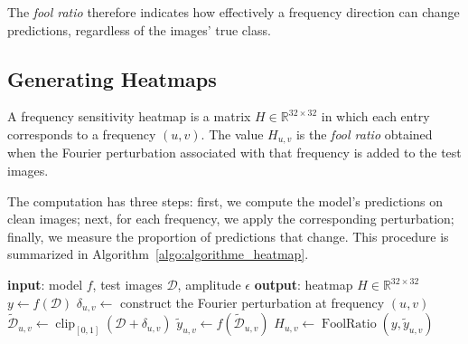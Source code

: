 The \textit{fool ratio} therefore indicates how effectively a frequency direction can change
predictions, regardless of the images' true class.




\subsection{Generating Heatmaps}
\label{subsec:generation_heatmaps}

A frequency sensitivity heatmap is a matrix $H \in \mathbb{R}^{32\times32}$ in which each
entry corresponds to a frequency $(u,v)$. The value $H_{u,v}$ is the \textit{fool ratio} obtained when
the Fourier perturbation associated with that frequency is added to the test images.

The computation has three steps: first, we compute the model's predictions on clean images;
next, for each frequency, we apply the corresponding perturbation; finally, we measure
the proportion of predictions that change. This procedure is summarized in
Algorithm~\ref{algo:algorithme_heatmap}.

\begin{algorithm}[H]
\caption{Generating a frequency sensitivity heatmap}
\label{algo:algorithme_heatmap}
\begin{algorithmic}
\State \textbf{input}: model $f$, test images $\mathcal{D}$, amplitude $\epsilon$
\State \textbf{output}: heatmap $H \in \mathbb{R}^{32 \times 32}$
\State
\State $y \leftarrow f(\mathcal{D})$ 
        \State $\delta_{u,v} \leftarrow$ construct the Fourier perturbation at frequency $(u,v)$
        \State $\tilde{\mathcal{D}}_{u,v} \leftarrow \operatorname{clip}_{[0,1]}(\mathcal{D} + \delta_{u,v})$
        \State $\tilde{y}_{u,v} \leftarrow f(\tilde{\mathcal{D}}_{u,v})$
        \State $H_{u,v} \leftarrow \operatorname{FoolRatio}(y,\tilde{y}_{u,v})$
    \EndFor
\EndFor
\end{algorithmic}
\end{algorithm}

